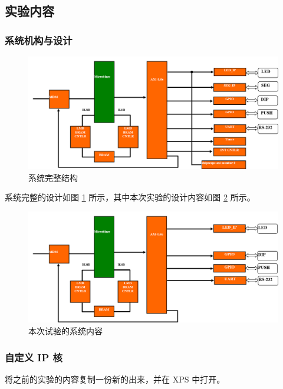 \documentclass{ctexart}
\begin{document}
\subsection{实验内容}

\subsubsection{系统机构与设计}

\begin{figure}[h!]
    \centering
    \includegraphics[width=1\linewidth]{report3-1}
    \caption{系统完整结构}
    \label{fig:report3-1}
\end{figure}
系统完整的设计如图 \ref{fig:report3-1} 所示，其中本次实验的设计内容如图 \ref{fig:report4-1} 所示。


\begin{figure}[h!]
\centering
\includegraphics[width=1\linewidth]{report4-1}
\caption{本次试验的系统内容}
\label{fig:report4-1}
\end{figure}




\subsubsection{自定义 IP 核}

将之前的实验的内容复制一份新的出来，并在 XPS 中打开。
\end{document}
